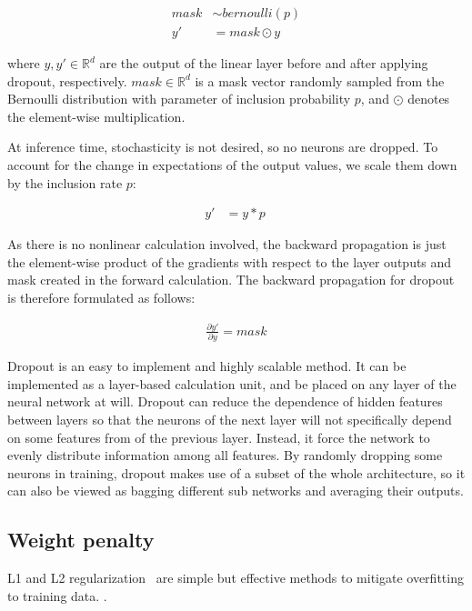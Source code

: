 \documentclass{article}
\begin{document}
\begin{align}
    mask &\sim bernoulli(p)\\
    y' &= mask \odot y\
\end{align}

where $y, y' \in \mathbb{R}^d$ are the output of the linear layer 
before and after applying dropout, 
respectively. $mask \in \mathbb{R}^d$ is a mask vector randomly sampled from the
Bernoulli distribution with parameter of inclusion probability
$p$, and $\odot$ denotes the element-wise multiplication.

At inference time, stochasticity is not desired, so no neurons
are dropped. To account for the change in expectations of the
output values, we scale them down by the inclusion rate
$p$:

\begin{align}
    y' &= y*p\
\end{align}

As there is no nonlinear calculation involved, the backward
propagation is just the element-wise product of the gradients
with respect to the layer outputs and mask created
in the forward calculation. The backward propagation for
dropout is therefore formulated as follows:

\begin{align}
    \frac{\partial y'}{\partial y} = mask
\end{align}

Dropout is an easy to implement and highly scalable
method. It can be implemented as a layer-based calculation
unit, and be placed on any layer of the neural network at
will. Dropout can reduce the dependence of hidden features
between layers so that the neurons of the next layer will not
specifically depend on some features from of the previous layer.
Instead, it force the network to evenly distribute information
among all features. By randomly dropping some neurons in training,
dropout makes use of a subset of the whole architecture, so it can 
also be viewed as bagging different sub networks and averaging their
outputs.



\subsection{Weight penalty}

L1 and L2 regularization~\cite{ng2004feature} are simple but effective
methods to mitigate overfitting to training data.
\questionThirteen.
\end{document}
